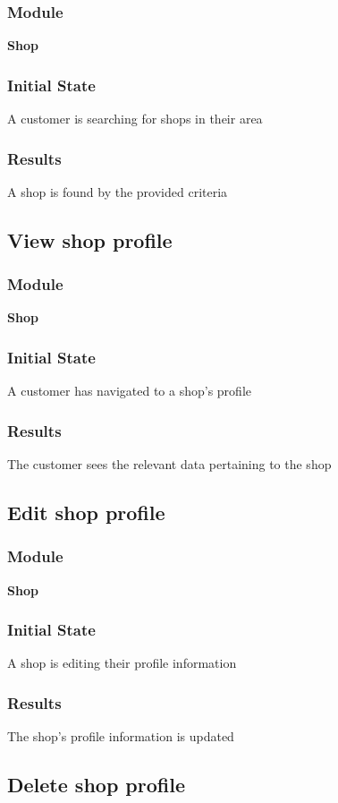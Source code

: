 \documentclass[12pt, titlepage]{article}
\begin{document}
    \subsubsection{Module}
    \textbf{Shop}
    \subsubsection{Initial State}
    A customer is searching for shops in their area
    \subsubsection{Results}
    A shop is found by the provided criteria

\subsection{View shop profile}
    \subsubsection{Module}
    \textbf{Shop}
    \subsubsection{Initial State}
    A customer has navigated to a shop's profile
    \subsubsection{Results}
    The customer sees the relevant data pertaining to the shop

\subsection{Edit shop profile}
    \subsubsection{Module}
    \textbf{Shop}
    \subsubsection{Initial State}
    A shop is editing their profile information
    \subsubsection{Results}
    The shop's profile information is updated

\subsection{Delete shop profile}
\end{document}
